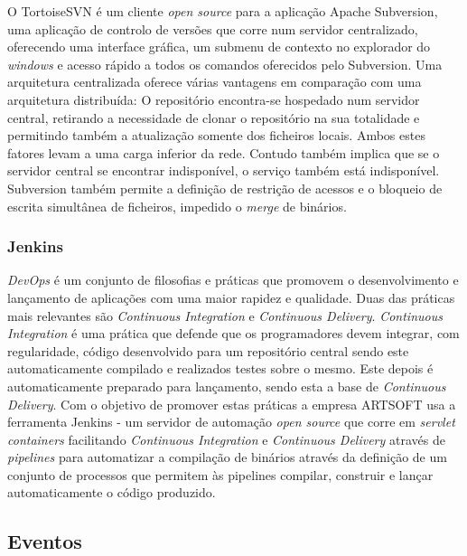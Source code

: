 \documentclass[sigplan]{acmart}
\begin{document}
O TortoiseSVN é um cliente \textit{open source} para a aplicação Apache Subversion, uma aplicação de controlo de versões que corre num servidor centralizado, oferecendo uma interface gráfica, um submenu de contexto no explorador do \textit{windows} e acesso rápido a todos os comandos oferecidos pelo Subversion. Uma arquitetura centralizada oferece várias vantagens em comparação com uma arquitetura distribuída: O repositório encontra-se hospedado num servidor central, retirando a necessidade de clonar o repositório na sua totalidade e permitindo também a atualização somente dos ficheiros locais. Ambos estes fatores levam a uma carga inferior da rede. Contudo também implica que se o servidor central se encontrar indisponível, o serviço também está indisponível. Subversion também permite a definição de restrição de acessos e o bloqueio de escrita simultânea de ficheiros, impedido o \textit{merge} de binários.

\subsubsection{Jenkins}

\textit{DevOps} é um conjunto de filosofias e práticas que promovem o desenvolvimento e lançamento de aplicações com uma maior rapidez e qualidade. Duas das práticas mais relevantes são \textit{Continuous Integration} e \textit{Continuous Delivery}. \textit{Continuous Integration} é uma prática que defende que os programadores devem integrar, com regularidade, código desenvolvido para um repositório central sendo este automaticamente compilado e realizados testes sobre o mesmo. Este depois é automaticamente preparado para lançamento, sendo esta a base de \textit{Continuous Delivery}. Com o objetivo de promover estas práticas a empresa ARTSOFT usa a ferramenta Jenkins - um servidor de automação \textit{open source} que corre em \textit{servlet containers} facilitando \textit{Continuous Integration} e \textit{Continuous Delivery} através de \textit{pipelines} para automatizar a compilação de binários através da definição de um conjunto de processos que permitem às pipelines compilar, construir e lançar automaticamente o código produzido.

\subsection{Eventos}
\end{document}
